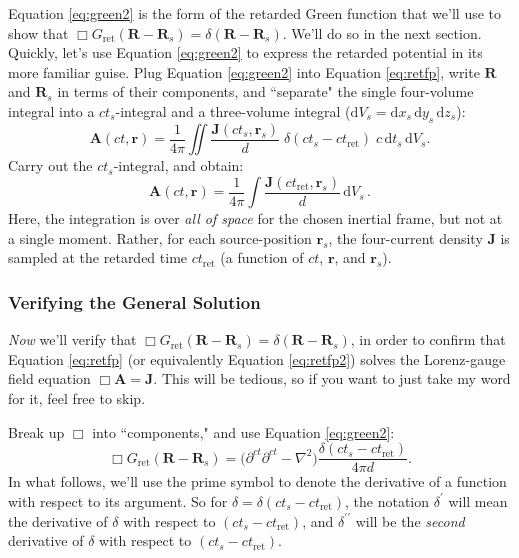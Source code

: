 \documentclass[12pt]{article}
\renewcommand{\vv}[1]{\mathbf{#1}}
\newcommand{\dd}[1]{\mathrm{d}#1}
\begin{document}
Equation \ref{eq:green2} is the form of the retarded Green function that we'll use to show that $\Box G_{\textrm{ret}} (\vv R - \vv R_{s}) = \delta ( \vv R - \vv R_{s})$. We'll do so in the next section. Quickly, let's use Equation \ref{eq:green2} to express the retarded potential in its more familiar guise. Plug Equation \ref{eq:green2} into Equation \ref{eq:retfp}, write $\vv R$ and $\vv R_{s}$ in terms of their components, and ``separate" the single four-volume integral into a $ct_s$-integral and a three-volume integral ($\dd V_{s} = \dd x_{s} \, \dd y_{s} \, \dd z_{s}$):
\begin{equation*}
\vv A(ct, \vv r) = \dfrac{1}{4 \pi} \iint \dfrac{\vv J(ct_{s}, \vv r _{s})}{d}  \; \delta ( ct_{s} - ct_{\textrm{ret}} )  \; c \, \dd t_{s} \, \dd V_{s}.
\end{equation*}
Carry out the $ct_{s}$-integral, and obtain:
\begin{equation}\label{eq:retfp2}
\boxed{
\vv A(ct, \vv r) = \dfrac{1}{4 \pi} \int \dfrac{\vv J (ct_{\textrm{ret}}, \vv r _{s})}{d} \, \dd V_{s}
} \, .
\end{equation}
Here, the integration is over \emph{all of space} for the chosen inertial frame, but not at a single moment. Rather, for each source-position $\vv r_{s}$, the four-current density $\vv J$ is sampled at the retarded time $ct_{\textrm{ret}}$ (a function of $ct$, $\vv r$, and $\vv r_{s}$).

\subsubsection{Verifying the General Solution}

\emph{Now} we'll verify that $\Box G_{\textrm{ret}}( \vv R - \vv R_{s} ) = \delta ( \vv R - \vv R_{s} )$, in order to confirm that Equation \ref{eq:retfp} (or equivalently Equation \ref{eq:retfp2}) solves the Lorenz-gauge field equation $\Box \vv A = \vv J$. This will be tedious, so if you want to just take my word for it, feel free to skip.

Break up $\Box$ into ``components," and use Equation \ref{eq:green2}:
\begin{equation}\label{eq:green3}
\Box G_{\textrm{ret}} (\vv R - \vv R_{s}) = \Big( \partial^{ct} \partial^{ct} - \nabla^2 \Big) \dfrac{\delta ( ct_{s} - ct_{\textrm{ret}} )}{4 \pi d}.
\end{equation}
In what follows, we'll use the prime symbol to denote the derivative of a function with respect to its argument. So for $\delta = \delta ( ct_{s} - ct_{\textrm{ret}} )$, the notation $\delta^\prime$ will mean the derivative of $\delta$ with respect to $( ct_{s} - ct_{\textrm{ret}} )$, and $\delta ^{\prime \prime}$ will be the \emph{second} derivative of $\delta$ with respect to $( ct_{s} - ct_{\textrm{ret}} )$.
\end{document}
